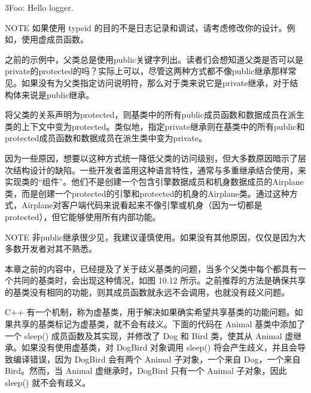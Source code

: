 \begin{cpp}
3Foo: Hello logger.
\end{cpp}

\begin{myNotic}{NOTE}
如果使用 typeid 的目的不是日志记录和调试，请考虑修改你的设计。例如，使用虚成员函数。
\end{myNotic}


之前的示例中，父类总是使用public关键字列出。读者们会想知道父类是否可以是private的protected的吗？实际上可以，尽管这两种方式都不像public继承那样常见。如果没有为父类指定访问说明符，那么对于类来说它是private继承，对于结构体来说是public继承。

将父类的关系声明为protected，则基类中的所有public成员函数和数据成员在派生类的上下文中变为protected。类似地，指定private继承则在基类中的所有public和protected成员函数和数据成员在派生类中变为private。

因为一些原因，想要以这种方式统一降低父类的访问级别，但大多数原因暗示了层次结构设计的缺陷。一些开发者滥用这种语言特性，通常与多重继承结合使用，来实现类的“组件”。他们不是创建一个包含引擎数据成员和机身数据成员的Airplane类，而是创建一个protected的引擎和protected的机身的Airplane类。通过这种方式，Airplane对客户端代码来说看起来不像引擎或机身（因为一切都是protected），但它能够使用所有内部功能。

\begin{myNotic}{NOTE}
非public继承很少见，我建议谨慎使用。如果没有其他原因，仅仅是因为大多数开发者对其不熟悉。
\end{myNotic}


本章之前的内容中，已经提及了关于歧义基类的问题，当多个父类中每个都具有一个共同的基类时，会出现这种情况，如图 10.12 所示。之前推荐的方法是确保共享的基类没有相同的功能，则其成员函数就永远不会调用，也就没有歧义问题。


C++ 有一个机制，称为虚基类，用于解决如果确实希望共享基类的功能问题。如果共享的基类标记为虚基类，就不会有歧义。下面的代码在 Animal 基类中添加了一个 sleep() 成员函数及其实现，并修改了 Dog 和 Bird 类，使其从 Animal 虚继承。如果没有使用虚基类，对 DogBird 对象调用 sleep() 将会产生歧义，并且会导致编译错误，因为 DogBird 会有两个 Animal 子对象，一个来自 Dog，一个来自 Bird。然而，当 Animal 虚继承时，DogBird 只有一个 Animal 子对象，因此 sleep() 就不会有歧义。

